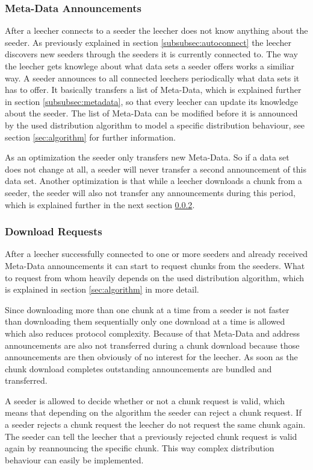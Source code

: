 \subsubsection{Meta-Data Announcements}
After a leecher connects to a seeder the leecher does not know anything about the seeder. As previously explained in section \ref{subsubsec:autoconnect} the leecher discovers new seeders through the seeders it is currently connected to. The way the leecher gets knowlege about what data sets a seeder offers works a similiar way. A seeder announces to all connected leechers periodically what data sets it has to offer. It basically transfers a list of Meta-Data, which is explained further in section \ref{subsubsec:metadata}, so that every leecher can update its knowledge about the seeder. The list of Meta-Data can be modified before it is announced by the used distribution algorithm to model a specific distribution behaviour, see section \ref{sec:algorithm} for further information.

As an optimization the seeder only transfers new Meta-Data. So if a data set does not change at all, a seeder will never transfer a second announcement of this data set. Another optimization is that while a leecher downloads a chunk from a seeder, the seeder will also not transfer any announcements during this period, which is explained further in the next section \ref{subsubsec:downloadreq}.


\subsubsection{Download Requests}
\label{subsubsec:downloadreq}
After a leecher successfully connected to one or more seeders and already received Meta-Data announcements it can start to request chunks from the seeders. What to request from whom heavily depends on the used distribution algorithm, which is explained in section \ref{sec:algorithm} in more detail. 

Since downloading more than one chunk at a time from a seeder is not faster than downloading them sequentially only one download at a time is allowed which also reduces protocol complexity. Because of that Meta-Data and address announcements are also not transferred during a chunk download because those announcements are then obviously of no interest for the leecher. As soon as the chunk download completes outstanding announcements are bundled and transferred.

A seeder is allowed to decide whether or not a chunk request is valid, which means that depending on the algorithm the seeder can reject a chunk request. If a seeder rejects a chunk request the leecher do not request the same chunk again. The seeder can tell the leecher that a previously rejected chunk request is valid again by reannouncing the specific chunk. This way complex distribution behaviour can easily be implemented.


